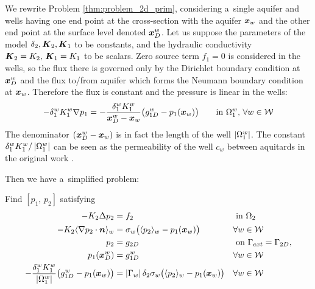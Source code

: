 We rewrite Problem \ref{thm:problem_2d_prim}, considering a~single aquifer and wells having one end point
at the cross-section with the aquifer $\mathbf{\boldsymbol{x}}_w$ and the other end point at the surface level denoted $\mathbf{\boldsymbol{x}}^w_D$.
Let us suppose the parameters of the model $\delta_2, \mathbf{\boldsymbol{K}}_2, \mathbf{\boldsymbol{K}}_1$ to be constants, and
the hydraulic conductivity $\mathbf{\boldsymbol{K}}_2 = K_2,\, \mathbf{\boldsymbol{K}}_1 = K_1$ to be scalars.
Zero source term $f_1=0$ is considered in the wells, so the flux there is governed only by the Dirichlet
boundary condition at $\mathbf{\boldsymbol{x}}^w_D$ and the flux to/from aquifer which forms the Neumann boundary condition at $\mathbf{\boldsymbol{x}}_w$.
Therefore the flux is constant and the pressure is linear in the wells:
\begin{equation} \label{eqn:linear_pressure_in_1d}
    -\delta^w_1 K^w_1 \nabla p_1 = -\frac{\delta^w_1 K^w_1}{\mathbf{\boldsymbol{x}}^w_D-\mathbf{\boldsymbol{x}}_w} \big( g^w_{1D} - p_1(\mathbf{\boldsymbol{x}}_w) \big) \qquad \textrm{in } \Omega^w_1,\,\forall w\in\mathcal{W}
\end{equation}
The denominator $(\mathbf{\boldsymbol{x}}^w_D-\mathbf{\boldsymbol{x}}_w)$ is in fact the length of the well $\left|\Omega^w_1\right|$.
The constant ${\delta^w_1 K^w_1}/\left|\Omega^w_1\right|$ can be seen as the permeability of the well $c_w$ between aquitards
in the original work \cite{exner_2016}.

Then we have a~simplified problem:
\begin{thmproblem} \label{thm:prim_simple_problem}
Find $[p_1,\,p_2]$ satisfying
\begin{align}
-K_2 \Delta p_2 &= f_2 && \textrm{ in } \Omega_2 \label{eqn:prim_simple_poisson}\\
-K_2\langle\nabla p_2 \cdot \mathbf{\boldsymbol{n}}\rangle_w &= \sigma_w\big( \langle p_2\rangle_w - p_1(\mathbf{\boldsymbol{x}}_w)\big)
    && \forall w\in\mathcal{W} \label{eqn:prim_simple_well_edge_bc} \\
p_2 &= g_{2D} && \textrm{ on } \Gamma_{ext} = \Gamma_{2D}, \label{eqn:prim_simple_dirichlet} \\
p_1(\mathbf{\boldsymbol{x}}^w_D) &= g^w_{1D} && \forall w\in\mathcal{W} \label{eqn:prim_simple_well_top_bc} \\
-\frac{\delta^w_1 K^w_1}{\left|\Omega^w_1\right|} \big(g^w_{1D} - p_1(\mathbf{\boldsymbol{x}}_w)\big) &=  \left|\Gamma_w\right| \delta_2 \sigma_w\big( \langle p_2\rangle_w - p_1(\mathbf{\boldsymbol{x}}_w)\big) 
    && \forall w\in\mathcal{W}\label{eqn:prim_simple_well_flow}
\end{align}
%
%
% 
\end{thmproblem}

